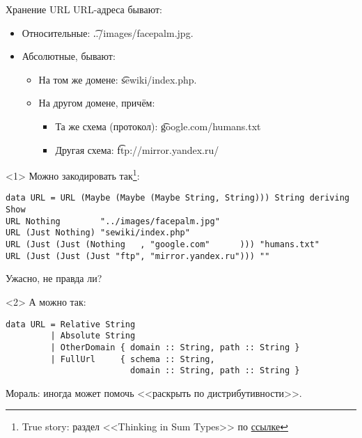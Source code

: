 \begin{frame}[t,fragile]{Хранение URL}
	URL-адреса бывают:
	\begin{itemize}
		\item Относительные: \t{../images/facepalm.jpg}.
		\item Абсолютные, бывают:
			\begin{itemize}
				\item На том же домене: \t{sewiki/index.php}.
				\item На другом домене, причём:
					\begin{itemize}
						\item Та же схема (протокол): \t{google.com/humans.txt}
	                    \item Другая схема: \t{ftp://mirror.yandex.ru/}
                   	\end{itemize}
			\end{itemize}
	\end{itemize}
\begin{onlyenv}<1>
	Можно закодировать так\footnote{True story: раздел <<Thinking in Sum Types>> по \href{https://chadaustin.me/2015/07/sum-types/}{ссылке}}:
\begin{verbatim}
data URL = URL (Maybe (Maybe (Maybe String, String))) String deriving Show
URL Nothing        "../images/facepalm.jpg"
URL (Just Nothing) "sewiki/index.php"
URL (Just (Just (Nothing   , "google.com"      ))) "humans.txt"
URL (Just (Just (Just "ftp", "mirror.yandex.ru"))) ""
\end{verbatim}
Ужасно, не правда ли?
\end{onlyenv}

\begin{onlyenv}<2>
А можно так:
\begin{verbatim}
data URL = Relative String
         | Absolute String
         | OtherDomain { domain :: String, path :: String }
         | FullUrl     { schema :: String,
                         domain :: String, path :: String }
\end{verbatim}
Мораль: иногда может помочь <<раскрыть по дистрибутивности>>.
\end{onlyenv}
\end{frame}

